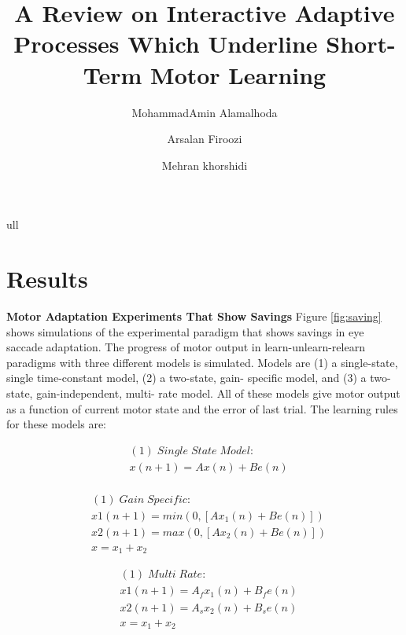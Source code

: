 \documentclass[9pt,twocolumn]{paper-template}
\title{A Review on Interactive Adaptive Processes Which Underline Short-Term Motor Learning}
\author[a]{MohammadAmin Alamalhoda}
\author[a]{Arsalan Firoozi}
\author[a]{Mehran khorshidi}
\affil[a]{Student, EE Department, Sharif University of Technology}
\begin{document}
\maketitle
\thispagestyle{firststyle}

ull
\\
\section*{Results}


\textbf{Motor Adaptation Experiments That Show Savings}
Figure \ref{fig:saving} shows simulations of the experimental paradigm that shows savings in eye saccade adaptation. The progress of motor output in learn-unlearn-relearn paradigms with three different models is simulated. Models are (1) a single-state, single time-constant model, (2) a two-state, gain- specific model, and (3) a two-state, gain-independent, multi- rate model. All of these models give motor output as a function of current motor state and the error of last trial. The learning rules for these models are:

\begin{eqnarray*}
& (1)\;Single\;State\;Model:\\
& x(n+1) = Ax(n)+Be(n)\\
\end{eqnarray*}

\begin{eqnarray*}
& (1)\;Gain\;Specific:\\
&x1(n+1) = min(0,[Ax_1(n)+Be(n)])\\
&x2(n+1) = max(0,[Ax_2(n)+Be(n)])\\
&x = x_1+x_2
\end{eqnarray*}


\begin{eqnarray*}
& (1)\;Multi\;Rate:\\
& x1(n+1) = A_fx_1(n) + B_fe(n)\\
& x2(n+1) = A_sx_2(n) + B_se(n)\\
&x = x_1+x_2
\end{eqnarray*}
\end{document}
